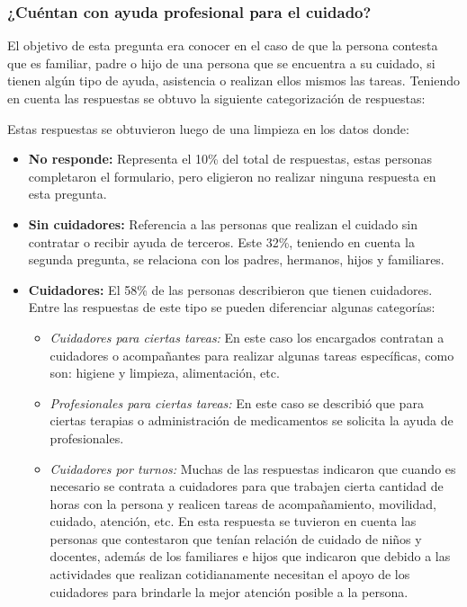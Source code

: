 \documentclass[a4paper,12pt]{article}
\begin{document}
    \subsubsection{¿Cuéntan con ayuda profesional para el cuidado?}
    El objetivo de esta pregunta era conocer en el caso de que la persona contesta que es familiar, padre o hijo de una persona que se encuentra a su cuidado, si tienen algún tipo de ayuda, asistencia o realizan ellos mismos las tareas. \newline
    Teniendo en cuenta las respuestas se obtuvo la siguiente categorización de respuestas:
         \newline
    Estas respuestas se obtuvieron luego de una limpieza en los datos donde:
    \begin{itemize}
        \item \textbf{No responde:} Representa el 10\% del total de respuestas, estas personas completaron el formulario, pero eligieron no realizar ninguna respuesta en esta pregunta.
        \item \textbf{Sin cuidadores:} Referencia a las personas que realizan el cuidado sin contratar o recibir ayuda de terceros. Este 32\%, teniendo en cuenta la segunda pregunta, se relaciona con los padres, hermanos, hijos y familiares. 
        \item \textbf{Cuidadores:} El 58\% de las personas describieron que tienen cuidadores. Entre las respuestas de este tipo se pueden diferenciar algunas categorías:
        \begin{itemize}
            \item \textit{Cuidadores para ciertas tareas:} En este caso los encargados contratan a cuidadores o acompañantes para realizar algunas tareas específicas, como son: higiene y limpieza, alimentación, etc.
            \item \textit{Profesionales para ciertas tareas:} En este caso se describió que para ciertas terapias o administración de medicamentos se solicita la ayuda de profesionales.
            \item \textit{Cuidadores por turnos:} Muchas de las respuestas indicaron que cuando es necesario se contrata a cuidadores para que trabajen cierta cantidad de horas con la persona y realicen tareas de acompañamiento, movilidad, cuidado, atención, etc. En esta respuesta se tuvieron en cuenta las personas que contestaron que tenían relación de cuidado de niños y docentes, además de los familiares e hijos que indicaron que debido a las actividades que realizan cotidianamente necesitan el apoyo de los cuidadores para brindarle la mejor atención posible a la persona.
        \end{itemize}
    \end{itemize}
\end{document}
